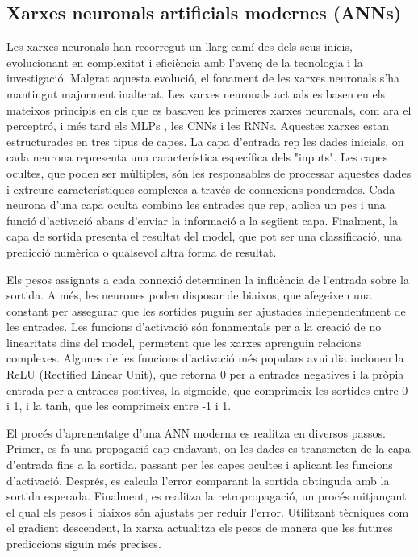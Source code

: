 \documentclass[a4paper,11pt, titlepage, twoside]{article}
\begin{document}
\subsection{Xarxes neuronals artificials modernes (ANNs)}
Les xarxes neuronals han recorregut un llarg camí des dels seus inicis, evolucionant en complexitat i eficiència amb l'avenç de la tecnologia i la investigació. Malgrat aquesta evolució, el fonament de les xarxes neuronals s'ha mantingut majorment inalterat. Les xarxes neuronals actuals es basen en els mateixos principis en els que es basaven les primeres xarxes neuronals, com ara el perceptró\cite{rosenblatt1958perceptron}, i més tard els MLPs \cite{rumelhart1986learning}, les CNNs \cite{LeCun1989} i les RNNs. Aquestes xarxes estan estructurades en tres tipus de capes. La capa d'entrada rep les dades inicials, on cada neurona representa una característica específica dels "inputs". Les capes ocultes, que poden ser múltiples, són les responsables de processar aquestes dades i extreure característiques complexes a través de connexions ponderades. Cada neurona d'una capa oculta combina les entrades que rep, aplica un pes i una funció d'activació abans d'enviar la informació a la següent capa. Finalment, la capa de sortida presenta el resultat del model, que pot ser una classificació, una predicció numèrica o qualsevol altra forma de resultat.

Els pesos assignats a cada connexió determinen la influència de l'entrada sobre la sortida. A més, les neurones poden disposar de biaixos, que afegeixen una constant per assegurar que les sortides puguin ser ajustades independentment de les entrades. Les funcions d'activació són fonamentals per a la creació de no linearitats dins del model, permetent que les xarxes aprenguin relacions complexes. Algunes de les funcions d'activació més populars avui dia inclouen la ReLU (Rectified Linear Unit), que retorna 0 per a entrades negatives i la pròpia entrada per a entrades positives, la sigmoide, que comprimeix les sortides entre 0 i 1, i la tanh, que les comprimeix entre -1 i 1.

El procés d'aprenentatge d'una ANN moderna es realitza en diversos passos. Primer, es fa una propagació cap endavant, on les dades es transmeten de la capa d'entrada fins a la sortida, passant per les capes ocultes i aplicant les funcions d'activació. Després, es calcula l'error comparant la sortida obtinguda amb la sortida esperada. Finalment, es realitza la retropropagació, un procés mitjançant el qual els pesos i biaixos són ajustats per reduir l'error. Utilitzant tècniques com el gradient descendent, la xarxa actualitza els pesos de manera que les futures prediccions siguin més precises.
\end{document}

